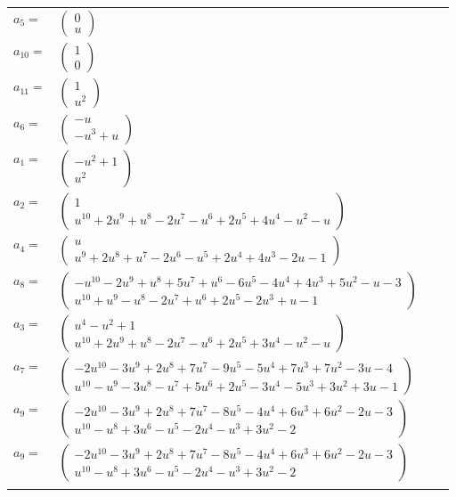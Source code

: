 \documentclass[1p]{elsarticle_modified}
\theoremstyle{definition}
\begin{document}
\begin{tabular}{m{7pt} m{180pt} m{7pt} m{180pt} }
\flushright $a_{5}=$&$\begin{pmatrix}0\\u\end{pmatrix}$ \\
\flushright $a_{10}=$&$\begin{pmatrix}1\\0\end{pmatrix}$ \\
\flushright $a_{11}=$&$\begin{pmatrix}1\\u^2\end{pmatrix}$ \\
\flushright $a_{6}=$&$\begin{pmatrix}- u\\- u^3+u\end{pmatrix}$ \\
\flushright $a_{1}=$&$\begin{pmatrix}- u^2+1\\u^2\end{pmatrix}$ \\
\flushright $a_{2}=$&$\begin{pmatrix}1\\u^{10}+2 u^9+u^8-2 u^7- u^6+2 u^5+4 u^4- u^2- u\end{pmatrix}$ \\
\flushright $a_{4}=$&$\begin{pmatrix}u\\u^9+2 u^8+u^7-2 u^6- u^5+2 u^4+4 u^3-2 u-1\end{pmatrix}$ \\
\flushright $a_{8}=$&$\begin{pmatrix}- u^{10}-2 u^9+u^8+5 u^7+u^6-6 u^5-4 u^4+4 u^3+5 u^2- u-3\\u^{10}+u^9- u^8-2 u^7+u^6+2 u^5-2 u^3+u-1\end{pmatrix}$ \\
\flushright $a_{3}=$&$\begin{pmatrix}u^4- u^2+1\\u^{10}+2 u^9+u^8-2 u^7- u^6+2 u^5+3 u^4- u^2- u\end{pmatrix}$ \\
\flushright $a_{7}=$&$\begin{pmatrix}-2 u^{10}-3 u^9+2 u^8+7 u^7-9 u^5-5 u^4+7 u^3+7 u^2-3 u-4\\u^{10}- u^9-3 u^8- u^7+5 u^6+2 u^5-3 u^4-5 u^3+3 u^2+3 u-1\end{pmatrix}$ \\
\flushright $a_{9}=$&$\begin{pmatrix}-2 u^{10}-3 u^9+2 u^8+7 u^7-8 u^5-4 u^4+6 u^3+6 u^2-2 u-3\\u^{10}- u^8+3 u^6- u^5-2 u^4- u^3+3 u^2-2\end{pmatrix}$\\ \flushright $a_{9}=$&$\begin{pmatrix}-2 u^{10}-3 u^9+2 u^8+7 u^7-8 u^5-4 u^4+6 u^3+6 u^2-2 u-3\\u^{10}- u^8+3 u^6- u^5-2 u^4- u^3+3 u^2-2\end{pmatrix}$\\&\end{tabular}
\end{document}
